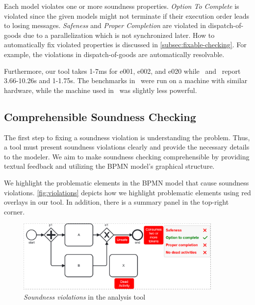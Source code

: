 \documentclass[runningheads]{llncs}
\begin{document}
Each model violates one or more soundness properties.
\textit{Option To Complete} is violated since the given models might not terminate if their execution order leads to losing messages.
\textit{Safeness} and \textit{Proper Completion} are violated in \textsf{dispatch-of-goods} due to a parallelization which is not synchronized later.
How to automatically fix violated properties is discussed in \autoref{subsec:fixable-checking}.
For example, the violations in \textsf{dispatch-of-goods} are automatically resolvable.

Furthermore, our tool takes 1-7ms for e001, e002, and e020 while~\cite{houhouFirstOrderLogicVerification2022} and~\cite{krauterFormalizationAnalysisBPMN2023} report 3.66-10.26s and 1-1.75s.
The benchmarks in~\cite{krauterFormalizationAnalysisBPMN2023} were run on a machine with similar hardware, while the machine used in~\cite{houhouFirstOrderLogicVerification2022} was slightly less powerful.

\subsection{Comprehensible Soundness Checking}

The first step to fixing a soundness violation is understanding the problem.
Thus, a tool must present soundness violations clearly and provide the necessary details to the modeler.
We aim to make soundness checking comprehensible by providing textual feedback and utilizing the BPMN model's graphical structure.

We highlight the problematic elements in the BPMN model that cause soundness violations.
\autoref{fig:violations} depicts how we highlight problematic elements using red overlays in our tool.
In addition, there is a summary panel in the top-right corner.

\begin{figure}[ht]
	\centering
	\includegraphics[width=0.9\textwidth]{images/violations}
	\caption{\textit{Soundness violations} in the analysis tool}
	\label{fig:violations}
\end{figure}
\end{document}
